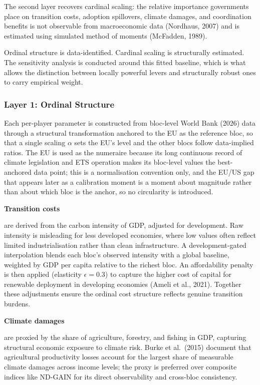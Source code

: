 \documentclass[10pt,a4paper]{article}
\newcommand{\bpar}[1]{%
  \par\addvspace{\medskipamount}%
  \needspace{4\baselineskip}%
  \noindent\textbf{#1}\par\nopagebreak[4]%
}
\begin{document}
The second layer recovers cardinal scaling: the relative importance governments place on transition costs, adoption spillovers, climate damages, and coordination benefits is not observable from macroeconomic data (Nordhaus, 2007) and is estimated using simulated method of moments (McFadden, 1989).

Ordinal structure is data-identified. Cardinal scaling is structurally estimated. The sensitivity analysis is conducted around this fitted baseline, which is what allows the distinction between locally powerful levers and structurally robust ones to carry empirical weight.

\needspace{12em}
\subsubsection{Layer 1: Ordinal Structure}

Each per-player parameter is constructed from bloc-level World Bank (2026) data through a structural transformation anchored to the EU as the reference bloc, so that a single scaling $\alpha$ sets the EU's level and the other blocs follow data-implied ratios. The EU is used as the numeraire because its long continuous record of climate legislation and ETS operation makes its bloc-level values the best-anchored data point; this is a normalisation convention only, and the EU/US gap that appears later as a calibration moment is a moment about magnitude rather than about which bloc is the anchor, so no circularity is introduced.

\bpar{Transition costs} are derived from the carbon intensity of GDP, adjusted for development. Raw intensity is misleading for less developed economies, where low values often reflect limited industrialisation rather than clean infrastructure. A development-gated interpolation blends each bloc's observed intensity with a global baseline, weighted by GDP per capita relative to the richest bloc. An affordability penalty is then applied (elasticity $\epsilon = 0.3$) to capture the higher cost of capital for renewable deployment in developing economies (Ameli et al., 2021). Together these adjustments ensure the ordinal cost structure reflects genuine transition burdens.

\bpar{Climate damages} are proxied by the share of agriculture, forestry, and fishing in GDP, capturing structural economic exposure to climate risk. Burke et al.\ (2015) document that agricultural productivity losses account for the largest share of measurable climate damages across income levels; the proxy is preferred over composite indices like ND-GAIN for its direct observability and cross-bloc consistency.
\end{document}

